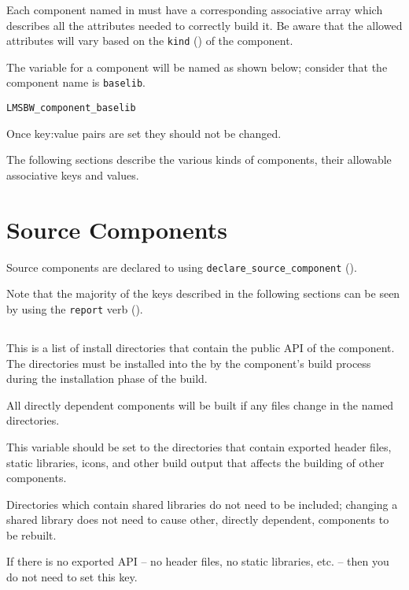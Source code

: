 Each component named in \lmsbwcomponents must have a corresponding
associative array which describes all the attributes needed to
correctly build it.  Be aware that the allowed attributes will vary
based on the \texttt{kind} () of the component.

The variable for a component will be named as shown below; consider
that the component name is \texttt{baselib}.

\begin{verbatim}
LMSBW_component_baselib
\end{verbatim}

Once key:value pairs are set they should not be changed.

The following sections describe the various kinds of components, their
allowable associative keys and values.

\section{Source Components}

Source components are declared to \lmsbw using
\texttt{declare\_source\_component}
().

Note that the majority of the keys described in the following sections
can be seen by using the \texttt{report} verb
().


\subsection{}\label{variables:api}

This is a list of install directories that contain the public API of
the component.  The directories must be installed into the \destdir by
the component's build process during the installation phase of the
build.

All directly dependent components will be built if any files change in
the named directories.

This variable should be set to the directories that contain exported
header files, static libraries, icons, and other build output that
affects the building of other components.

Directories which contain shared libraries do not need to be included;
changing a shared library does not need to cause other, directly
dependent, components to be rebuilt.

If there is no exported API -- no header files, no static libraries,
etc. -- then you do not need to set this key.


